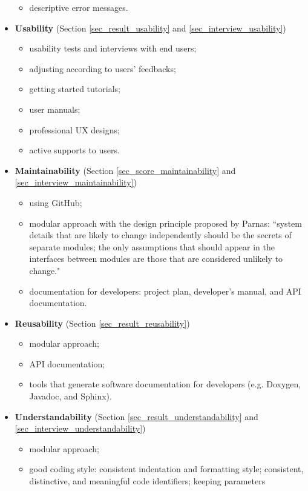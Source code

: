 \documentclass[preprint,12pt,authoryear]{elsarticle}
\begin{document}
\begin{itemize}
\begin{itemize}
    \item descriptive error messages.
\end{itemize}
\item \textbf{Usability} (Section \ref{sec_result_usability} and \ref{sec_interview_usability})
\begin{itemize}
    \item usability tests and interviews with end users;
    \item adjusting according to users’ feedbacks;
    \item getting started tutorials;
    \item user manuals;
    \item professional UX designs;
    \item active supports to users.
\end{itemize}
\item \textbf{Maintainability} (Section \ref{sec_score_maintainability} and
\ref{sec_interview_maintainability})
\begin{itemize}
    \item using GitHub;
    \item modular approach with the design principle proposed by Parnas:
    ``system details that are likely to change independently should be the
    secrets of separate modules; the only assumptions that should appear in the
    interfaces between modules are those that are considered unlikely to
    change." \citep{ParnasEtAl2000}
    \item documentation for developers: project plan, developer’s manual, and API documentation.
\end{itemize}
\item \textbf{Reusability} (Section \ref{sec_result_reusability})
\begin{itemize}
    \item modular approach;
    \item API documentation;
    \item tools that generate software documentation for developers (e.g.
    Doxygen, Javadoc, and Sphinx).
\end{itemize}
\item \textbf{Understandability} (Section \ref{sec_result_understandability} and
\ref{sec_interview_understandability})
\begin{itemize}
    \item modular approach;
    \item good coding style: consistent indentation and formatting style;
    consistent, distinctive, and meaningful code identifiers; keeping parameters

\end{itemize}
\end{itemize}
\end{document}
